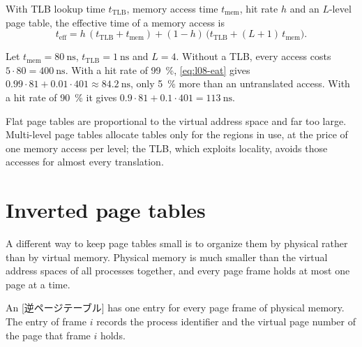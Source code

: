 \documentclass[../main.tex]{subfiles}
\begin{document}
With TLB lookup time $t_{\mathrm{TLB}}$, memory access time $t_{\mathrm{mem}}$,
hit rate $h$ and an $L$-level page table, the effective time of a memory
access is
\begin{equation}
  t_{\mathrm{eff}} = h\,(t_{\mathrm{TLB}} + t_{\mathrm{mem}})
    + (1-h)\,\bigl(t_{\mathrm{TLB}} + (L+1)\,t_{\mathrm{mem}}\bigr) .
  \label{eq:l08-eat}
\end{equation}

\begin{example}
  Let $t_{\mathrm{mem}} = \SI{80}{\nano\second}$,
  $t_{\mathrm{TLB}} = \SI{1}{\nano\second}$ and $L =
  4$.  Without a TLB, every access
  costs $5 \cdot 80 = \SI{400}{\nano\second}$.  With a hit rate of
  \SI{99}{\percent}, \cref{eq:l08-eat} gives $0.99 \cdot 81 + 0.01 \cdot 401
  \approx \SI{84.2}{\nano\second}$, only \SI{5}{\percent} more than an
  untranslated access.  With a hit rate of \SI{90}{\percent} it gives $0.9
  \cdot 81 + 0.1 \cdot 401 = \SI{113}{\nano\second}$.
\end{example}

\begin{keypoint}
  Flat page tables are proportional to the virtual address space and far
  too large.  Multi-level page tables allocate tables only for the regions
  in use, at the price of one memory access per level; the TLB, which
  exploits locality, avoids those accesses for almost every translation.
\end{keypoint}

\section{Inverted page tables}
\label{sec:l08-inverted}

A different way to keep page tables small is to organize them by physical
rather than by virtual memory.  Physical memory is much smaller than
the virtual address spaces of all processes together, and every page frame
holds at most one page at a time.

\begin{definition}
  An [逆ページテーブル] has one entry for every
  page frame of physical memory.  The entry of frame $i$ records the
  process identifier and the virtual page number of the page that frame
  $i$ holds.
\end{definition}
\end{document}
